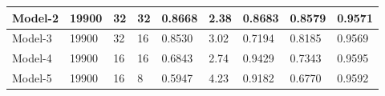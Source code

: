 \begin{table}[!htb]
\begin{center}
\begin{tabular}{|l|l|l|l|l|l|l|l|l|}
\textbf{Model-2}                & \textbf{19900}                                                  & \textbf{32}                                                        & \textbf{32}                                                        & \textbf{0.8668}   & \textbf{2.38}                                                     & \textbf{0.8683}      & \textbf{0.8579}                                              & \textbf{0.9571}                                               \\ \hline
Model-3                         & 19900                                                           & 32                                                                 & 16                                                                 & 0.8530            & 3.02                                                              & 0.7194               & 0.8185                                                       & 0.9569                                                        \\ \hline
Model-4                         & 19900                                                           & 16                                                                 & 16                                                                 & 0.6843            & 2.74                                                              & 0.9429               & 0.7343                                                       & 0.9595                                                        \\ \hline
Model-5                         & 19900                                                           & 16                                                                 & 8                                                                  & 0.5947            & 4.23                                                              & 0.9182               & 0.6770                                                       & 0.9592                                                        \\ \hline
\end{tabular}
\end{center}
\end{table}

